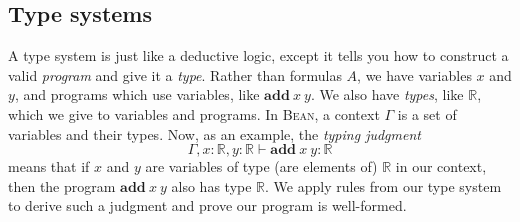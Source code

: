 \documentclass[a4paper]{article}
\newcommand{\Bean}{\textsc{Bean}}
\newcommand{\R}{\mathbb{R}}
\newcommand{\add}[2]{\textbf{add}\ {#1}\ {#2}}
\begin{document}
\subsection{Type systems}
A type system is just like a deductive logic, except it tells you how to construct a valid \emph{program} and give it a \emph{type}. Rather than formulas $A$, we have variables $x$ and $y$, and programs which use variables, like $\add{x}{y}$. We also have \emph{types}, like $\R$, which we give to variables and programs. In \Bean{}, a context $\Gamma$ is a set of variables and their types. Now, as an example, the \emph{typing judgment}
\begin{equation*}
    \Gamma,x:\R,y:\R\vdash \add{x}{y}:\R
\end{equation*}
means that if $x$ and $y$ are variables of type (are elements of) $\R$ in our context, then the program $\add{x}{y}$ also has type $\R$. We apply rules from our type system to derive such a judgment and prove our program is well-formed.
\end{document}
